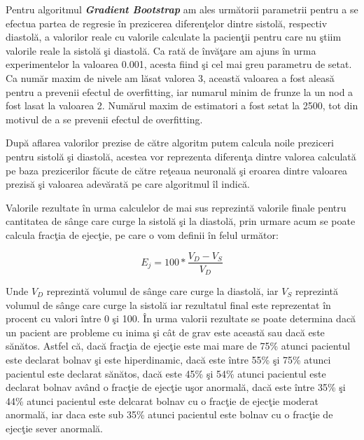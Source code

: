 Pentru algoritmul \textbf{\textit{Gradient Bootstrap}} am ales urm\u{a}torii parametrii pentru a se efectua partea de regresie \^{i}n prezicerea diferen\c{t}elor dintre sistol\u{a}, respectiv diastol\u{a}, a valorilor reale cu valorile calculate la pacien\c{t}ii pentru care nu \c{s}tiim valorile reale la sistol\u{a} \c{s}i diastol\u{a}. Ca rat\u{a} de \^{i}nv\u{a}\c{t}are am ajuns \^{i}n urma experimentelor la valoarea 0.001, acesta fiind \c{s}i cel mai greu parametru de setat. Ca num\u{a}r maxim de nivele am l\u{a}sat valorea 3, aceast\u{a} valoarea a fost aleas\u{a} pentru a prevenii efectul de overfitting, iar numarul minim de frunze la un nod a fost lasat la valoarea 2. Num\u{a}rul maxim de estimatori a fost setat la 2500, tot din motivul de a se prevenii efectul de overfitting.

\par

Dup\u{a} aflarea valorilor prezise de c\u{a}tre algoritm putem calcula noile preziceri pentru sistol\u{a} \c{s}i diastol\u{a}, acestea vor reprezenta diferen\c{t}a dintre valorea calculat\u{a} pe baza prezicerilor f\u{a}cute de c\u{a}tre re\c{t}eaua neuronal\u{a} \c{s}i eroarea dintre valoarea prezis\u{a} \c{s}i valoarea adev\u{a}rat\u{a} pe care algoritmul \^{i}l indic\u{a}. 

\par

Valorile rezultate \^{i}n urma calculelor de mai sus reprezint\u{a} valorile finale pentru cantitatea de s\^{a}nge care curge la sistol\u{a} \c{s}i la diastol\u{a}, prin urmare acum se poate calcula frac\c{t}ia de ejec\c{t}ie, pe care o vom definii \^{i}n felul urm\u{a}tor:

$$ E_j = 100 * \frac{V_D - V_S}{V_D} $$

Unde $V_D$ reprezint\u{a} volumul de s\^{a}nge care curge la diastol\u{a}, iar $V_S$ reprezint\u{a} volumul de s\^{a}nge care curge la sistol\u{a} iar rezultatul final este reprezentat \^{i}n procent cu valori \^{i}ntre 0 \c{s}i 100. \^{I}n urma valorii rezultate se poate determina dac\u{a} un pacient are probleme cu inima \c{s}i c\^{a}t de grav este aceast\u{a} sau dac\u{a} este s\u{a}n\u{a}tos. Astfel c\u{a}, dac\u{a} frac\c{t}ia de ejec\c{t}ie este mai mare de 75\% atunci pacientul este declarat bolnav \c{s}i este hiperdinamic, dac\u{a} este \^{i}ntre 55\% \c{s}i 75\% atunci pacientul este declarat s\u{a}n\u{a}tos, dac\u{a} este 45\% \c{s}i 54\% atunci pacientul este declarat bolnav av\^{a}nd o frac\c{t}ie de ejec\c{t}ie u\c{s}or anormal\u{a}, dac\u{a} este \^{i}ntre 35\% \c{s}i 44\% atunci pacientul este delcarat bolnav cu o frac\c{t}ie de ejec\c{t}ie moderat anormal\u{a}, iar daca este sub 35\% atunci pacientul este bolnav cu o frac\c{t}ie de ejec\c{t}ie sever anormal\u{a}.

